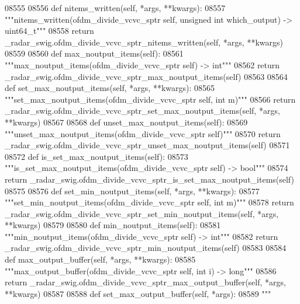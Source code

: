 \begin{DoxyCode}
{{{{{{{{{{{{{{{{{{{{{{{{{{{{08555 
08556     \textcolor{keyword}{def }nitems_written(self, *args, **kwargs):
08557         \textcolor{stringliteral}{"""nitems\_written(ofdm\_divide\_vcvc\_sptr self, unsigned int which\_output) -> uint64\_t"""}
08558         \textcolor{keywordflow}{return} \_radar\_swig.ofdm\_divide\_vcvc\_sptr\_nitems\_written(self, *args, **kwargs)
08559 
08560     \textcolor{keyword}{def }max_noutput_items(self):
08561         \textcolor{stringliteral}{"""max\_noutput\_items(ofdm\_divide\_vcvc\_sptr self) -> int"""}
08562         \textcolor{keywordflow}{return} \_radar\_swig.ofdm\_divide\_vcvc\_sptr\_max\_noutput\_items(self)
08563 
08564     \textcolor{keyword}{def }set_max_noutput_items(self, *args, **kwargs):
08565         \textcolor{stringliteral}{"""set\_max\_noutput\_items(ofdm\_divide\_vcvc\_sptr self, int m)"""}
08566         \textcolor{keywordflow}{return} \_radar\_swig.ofdm\_divide\_vcvc\_sptr\_set\_max\_noutput\_items(self, *args, **kwargs)
08567 
08568     \textcolor{keyword}{def }unset_max_noutput_items(self):
08569         \textcolor{stringliteral}{"""unset\_max\_noutput\_items(ofdm\_divide\_vcvc\_sptr self)"""}
08570         \textcolor{keywordflow}{return} \_radar\_swig.ofdm\_divide\_vcvc\_sptr\_unset\_max\_noutput\_items(self)
08571 
08572     \textcolor{keyword}{def }is_set_max_noutput_items(self):
08573         \textcolor{stringliteral}{"""is\_set\_max\_noutput\_items(ofdm\_divide\_vcvc\_sptr self) -> bool"""}
08574         \textcolor{keywordflow}{return} \_radar\_swig.ofdm\_divide\_vcvc\_sptr\_is\_set\_max\_noutput\_items(self)
08575 
08576     \textcolor{keyword}{def }set_min_noutput_items(self, *args, **kwargs):
08577         \textcolor{stringliteral}{"""set\_min\_noutput\_items(ofdm\_divide\_vcvc\_sptr self, int m)"""}
08578         \textcolor{keywordflow}{return} \_radar\_swig.ofdm\_divide\_vcvc\_sptr\_set\_min\_noutput\_items(self, *args, **kwargs)
08579 
08580     \textcolor{keyword}{def }min_noutput_items(self):
08581         \textcolor{stringliteral}{"""min\_noutput\_items(ofdm\_divide\_vcvc\_sptr self) -> int"""}
08582         \textcolor{keywordflow}{return} \_radar\_swig.ofdm\_divide\_vcvc\_sptr\_min\_noutput\_items(self)
08583 
08584     \textcolor{keyword}{def }max_output_buffer(self, *args, **kwargs):
08585         \textcolor{stringliteral}{"""max\_output\_buffer(ofdm\_divide\_vcvc\_sptr self, int i) -> long"""}
08586         \textcolor{keywordflow}{return} \_radar\_swig.ofdm\_divide\_vcvc\_sptr\_max\_output\_buffer(self, *args, **kwargs)
08587 
08588     \textcolor{keyword}{def }set_max_output_buffer(self, *args):
08589         \textcolor{stringliteral}{"""}
}}}}}}}}}}}}}}}}}}}}}}}}}}}}
\end{DoxyCode}
